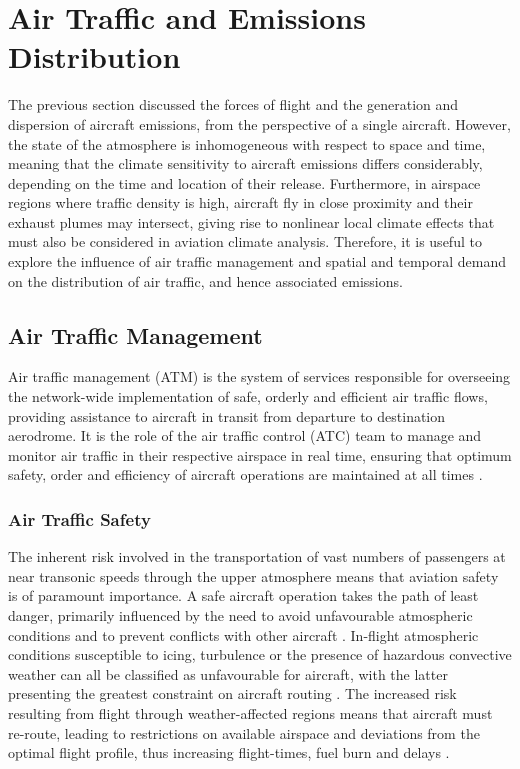 \section{Air Traffic and Emissions Distribution}
The previous section discussed the forces of flight and the generation and dispersion of aircraft emissions, from the perspective of a single aircraft. However, the state of the atmosphere is inhomogeneous with respect to space and time, meaning that the climate sensitivity to aircraft emissions differs considerably, depending on the time and location of their release. Furthermore, in airspace regions where traffic density is high, aircraft fly in close proximity and their exhaust plumes may intersect, giving rise to nonlinear local climate effects that must also be considered in aviation climate analysis. Therefore, it is useful to explore the influence of air traffic management and spatial and temporal demand on the distribution of air traffic, and hence associated emissions. 

\subsection{Air Traffic Management}
Air traffic management (ATM) is the system of services responsible for overseeing the network-wide implementation of safe, orderly and efficient air traffic flows, providing assistance to aircraft in transit from departure to destination aerodrome. It is the role of the air traffic control (ATC) team to manage and monitor air traffic in their respective airspace in real time, ensuring that optimum safety, order and efficiency of aircraft operations are maintained at all times \cite{SecretariatGeneral2016}. 


\subsubsection{Air Traffic Safety} 
The inherent risk involved in the transportation of vast numbers of passengers at near transonic speeds through the upper atmosphere means that aviation safety is of paramount importance. A safe aircraft operation takes the path of least danger, primarily influenced by the need to avoid unfavourable atmospheric conditions and to prevent conflicts with other aircraft \cite{Zhang2012, Baumgartner2007}. In-flight atmospheric conditions susceptible to icing, turbulence or the presence of hazardous convective weather can all be classified as unfavourable for aircraft, with the latter presenting the greatest constraint on aircraft routing \cite{Mitchell2006, Krozel2007}. The increased risk resulting from flight through weather-affected regions means that aircraft must re-route, leading to restrictions on available airspace and deviations from the optimal flight profile, thus increasing flight-times, fuel burn and delays \cite{weather_delay_2021}.

